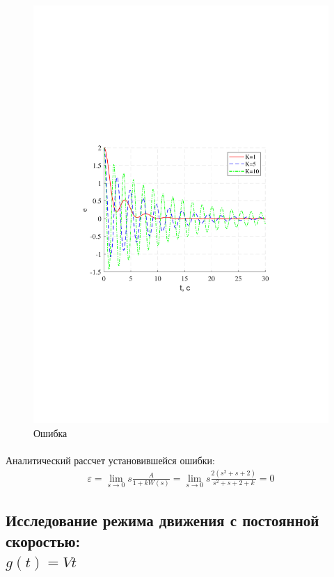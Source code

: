 \documentclass[a4paper,12pt]{article}
\begin{document}
	\begin{figure}[h!]
		\begin{center}
		\renewcommand{\figurename}{Рисунок}
		\includegraphics[width=5in]{err1ast1MOD.pdf}
		\caption{Ошибка}
		\label{s_9}
		\end{center}
	\end{figure}
	\newpage
	\paragraph {} Аналитический рассчет установившейся ошибки:\\
	\begin{gather}
	\varepsilon=\lim\limits_{s\rightarrow 0}s\frac{A}{1+kW(s)}=\lim\limits_{s\rightarrow 0}s\frac{2(s^2+s+2)}{s^2+s+2+k}=0
	\end{gather}
	
	\subsection{Исследование режима движения с постоянной скоростью:\\ $g(t)=Vt$}
\end{document}
